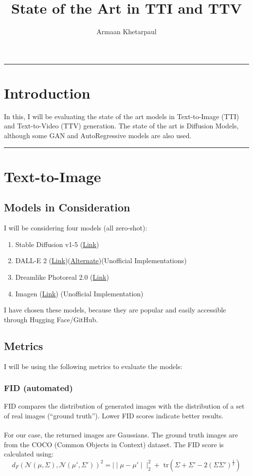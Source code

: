 \documentclass[12pt]{article}
\date{}
\title{\textbf{State of the Art in TTI and TTV}}
\author{Armaan Khetarpaul}
\begin{document}
\maketitle
\hrule height 2pt \relax
\section{Introduction}
In this, I will be evaluating the state of the art models in Text-to-Image (TTI) and Text-to-Video (TTV) generation. The state of the art is Diffusion Models, although some GAN and AutoRegressive models are also used.\\
\hrule height 2pt \relax
\section{Text-to-Image}
\subsection{Models in Consideration}
I will be considering four models (all zero-shot):
\begin{enumerate}
  \item Stable Diffusion v1-5 (\href{https://huggingface.co/runwayml/stable-diffusion-v1-5}{Link})
  \item DALL-E 2 (\href{https://huggingface.co/ehristoforu/dalle-3-xl-v2}{Link})(\href{https://github.com/lucidrains/DALLE2-pytorch}{Alternate})\quad (Unofficial Implementations)
  \item Dreamlike Photoreal 2.0 (\href{https://huggingface.co/dreamlike-art/dreamlike-photoreal-2.0}{Link})
  \item Imagen (\href{https://github.com/lucidrains/imagen-pytorch}{Link}) (Unofficial Implementation)
\end{enumerate}
I have chosen these models, because they are popular and easily accessible through Hugging Face/GitHub.
\subsection{Metrics}
I will be using the following metrics to evaluate the models:
\subsubsection{FID (automated)}
FID compares the distribution of generated images with the distribution of a set of real images (``ground truth''). Lower FID scores indicate better results.\\
\\
For our case, the returned images are Gaussians. The ground truth images are from the COCO (Common Objects in Context) dataset. The FID score is calculated using:
\[d_F(\mathcal{N}(\mu,\Sigma),\mathcal{N}(\mu',\Sigma'))^2=\mid\mid\mu-\mu'\mid\mid^2_2+\text{ tr}(\Sigma+\Sigma'-2(\Sigma\Sigma')^{\tfrac{1}{2}})\]
\end{document}
